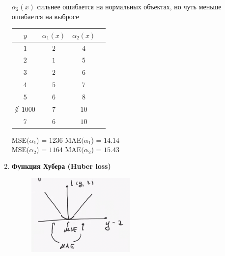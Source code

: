 \begin{enumerate}
                $\alpha_2(x)$ сильнее ошибается на нормальных объектах, но чуть меньше ошибается на выбросе
                \begin{table}[ht]
                    \centering
                    \begin{tabular}{|c|c|c|c|}
                    \hline
                    $y$ & $\alpha_1(x)$ & $\alpha_2(x)$\\
                    \hline
                    $1$ & $2$ & $4$\\
                    \hline
                    $2$ & $1$ & $5$\\
                    \hline
                    $3$ & $2$ & $6$\\ 
                    \hline
                    $4$ & $5$ & $7$\\
                    \hline
                    $5$ & $6$ & $8$\\
                    \hline
                    $\cancel{6}$ $1000$ & $7$ & $10$\\
                    \hline
                    $7$ & $6$ & $10$\\
                    \hline
                    \end{tabular}
                \end{table}

                MSE$({\alpha_1}$) = $1236$ \quad \quad MAE$({\alpha_1}$) = $14.14$\\
                MSE(${\alpha_2}$) = $1164$ \quad \quad MAE$({\alpha_2}$) = $15.43$
                
                

            \item \textbf{Функция Хубера (Huber loss)}
                \begin{figure}[H]
                    \centering
                    \includegraphics[width=0.5\textwidth]{images/2lecture/HuberLossPlot.png}
                \end{figure}


\end{enumerate}
